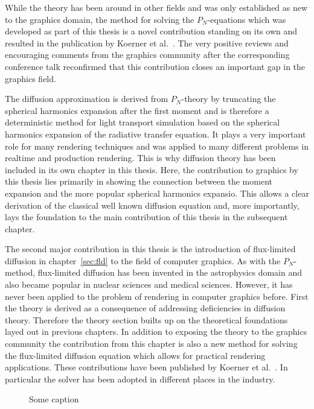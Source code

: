 While the theory has been around in other fields and was only established as new to the graphics domain, the method for solving the $P_N$-equations which was developed as part of this thesis is a novel contribution standing on its own and resulted in the publication by Koerner et al.~\cite{Koerner18}. The very positive reviews and encouraging comments from the graphics community after the corresponding conference talk reconfirmed that this contribution closes an important gap in the graphics field.

The diffusion approximation is derived from $P_N$-theory by truncating the spherical harmonics expansion after the first moment and is therefore a deterministic method for light transport simulation based on the spherical harmonics expansion of the radiative transfer equation. It plays a very important role for many rendering techniques and was applied to many different problems in realtime and production rendering. This is why diffusion theory has been included in its own chapter in this thesis. Here, the contribution to graphics by this thesis lies primarily in showing the connection between the moment expansion and the more popular spherical harmonics expansio. This allows a clear derivation of the classical well known diffusion equation and, more importantly, lays the foundation to the main contribution of this thesis in the subsequent chapter.

The second major contribution in this thesis is the introduction of flux-limited diffusion in chapter~\ref{sec:fld} to the field of computer graphics. As with the $P_N$-method, flux-limited diffusion has been invented in the astrophysics domain and also became popular in nuclear sciences and medical sciences.  However, it has never been applied to the problem of rendering in computer graphics before. First the theory is derived as a consequence of addressing deficiencies in diffusion theory. Therefore the theory section builts up on the theoretical foundations layed out in previous chapters. In addition to exposing the theory to the graphics community the contribution from this chapter is also a new method for solving the flux-limited diffusion equation which allows for practical rendering applications. These contributions have been published by Koerner et al.~\cite{Koerner14}. In particular the solver has been adopted in different places in the industry.
\begin{figure}[h]
\centering
{}
\caption{Some caption}
\label{fig:fld_conclusion_elementacular_1}
\end{figure}

